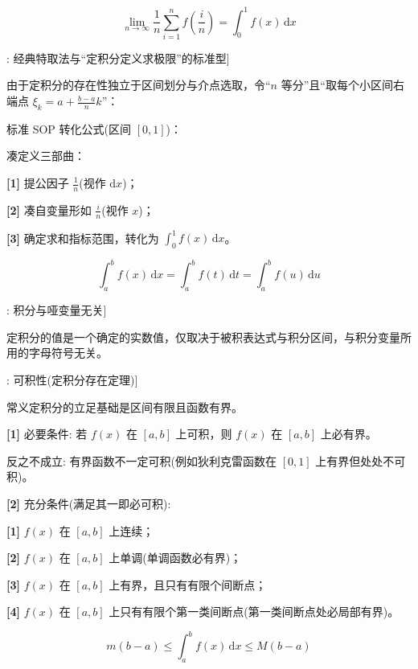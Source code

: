 \documentclass[11pt,a4paper,UTF8]{ctexart}
\begin{document}
\begin{equation*}
\lim_{n \to \infty} \frac{1}{n}\sum_{i=1}^n f\left(\frac{i}{n}\right) = \int_0^1 f(x)\,\mathrm{d}x
\end{equation*}
\begin{thmbox}[方法[1]: 经典特取法与“定积分定义求极限”的标准型]

由于定积分的存在性独立于区间划分与介点选取，令“$n$ 等分”且“取每个小区间右端点 $\xi_k = a + \frac{b-a}{n}k$”：


标准 SOP 转化公式(区间 $[0, 1]$)：


凑定义三部曲：

\textbf{[1]} 提公因子 $\frac{1}{n}$(视作 $\mathrm{d}x$)；

\textbf{[2]} 凑自变量形如 $\frac{i}{n}$(视作 $x$)；

\textbf{[3]} 确定求和指标范围，转化为 $\int_0^1 f(x)\,\mathrm{d}x$。

\end{thmbox}

\begin{equation*}
\int_a^b f(x)\,\mathrm{d}x = \int_a^b f(t)\,\mathrm{d}t = \int_a^b f(u)\,\mathrm{d}u
\end{equation*}
\begin{thmbox}[原理[3]: 积分与哑变量无关]


定积分的值是一个确定的实数值，仅取决于被积表达式与积分区间，与积分变量所用的字母符号无关。

\end{thmbox}
\begin{thmbox}[定理[1]: 可积性(定积分存在定理)]

常义定积分的立足基础是区间有限且函数有界。

\textbf{[1]} 必要条件: 若 $f(x)$ 在 $[a, b]$ 上可积，则 $f(x)$ 在 $[a, b]$ 上必有界。

反之不成立: 有界函数不一定可积(例如狄利克雷函数在 $[0,1]$ 上有界但处处不可积)。

\textbf{[2]} 充分条件(满足其一即必可积):

\textbf{[1]} $f(x)$ 在 $[a, b]$ 上连续；

\textbf{[2]} $f(x)$ 在 $[a, b]$ 上单调(单调函数必有界)；

\textbf{[3]} $f(x)$ 在 $[a, b]$ 上有界，且只有有限个间断点；

\textbf{[4]} $f(x)$ 在 $[a, b]$ 上只有有限个第一类间断点(第一类间断点处必局部有界)。

\end{thmbox}

\begin{equation*}
m(b - a) \leqslant \int_a^b f(x)\,\mathrm{d}x \leqslant M(b - a)
\end{equation*}
\end{document}
